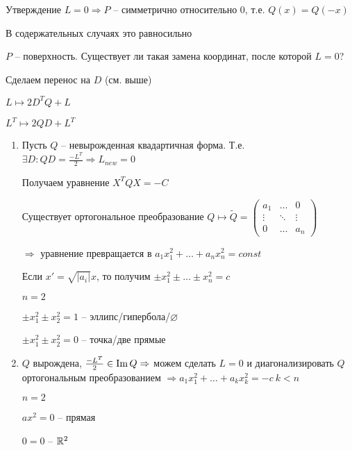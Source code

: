 \documentclass[12pt]{article}
\begin{document}
\begin{theo}{Утверждение}
    $L = 0 \Rightarrow P$ -- симметрично относительно 0, т.е. $Q(x) = Q(-x)$

    В содержательных случаях это равносильно

    $P$ -- поверхность. Существует ли такая замена координат, после которой $L = 0$?

    Сделаем перенос на $D$ (см. выше)

    $L \mapsto 2D^TQ + L$

    $L^T \mapsto 2QD + L^T$

    \begin{enumerate}
        \item Пусть $Q$ -- невырожденная квадартичная форма. Т.е. $\exists D : QD = \frac{-L^T}{2} \Rightarrow L_{new} = 0$
        
        Получаем уравнение $X^TQX = -C$

        Существует ортогональное преобразование $Q \mapsto \tilde{Q} = \begin{pmatrix}
            a_1 & \ldots & 0 \\
            \vdots & \ddots & \vdots \\
            0 & \ldots & a_n 
        \end{pmatrix}$

        $\Rightarrow$ уравнение превращается в $a_1x_1^2 + \ldots + a_nx_n^2 = const$

        Если $x' = \sqrt{|a_i|}x$, то получим $\pm x_1^2 \pm \ldots \pm x_n^2 = c$

        \begin{Example}{}
            $n = 2$

            $\pm x_1^2 \pm x_2^2 = 1$ -- эллипс/гипербола/$\varnothing$
        
            $\pm x_1^2 \pm x_2^2 = 0$ -- точка/две прямые
        \end{Example}

        \item $Q$ вырождена, $\frac{-L^T}{2} \in \operatorname{Im} Q \Rightarrow$ можем сделать $L = 0$ и диагонализировать $Q$ ортогональным преобразованием $\Rightarrow a_1x_1^2 + \ldots + a_kx_k^2 = -c\ k < n$
        
        \begin{Example}{}
            $n = 2$

            $ax^2 = 0$ -- прямая

            $0 = 0$ -- $\mathbb R^2$
        \end{Example}


\end{enumerate}
\end{theo}
\end{document}
